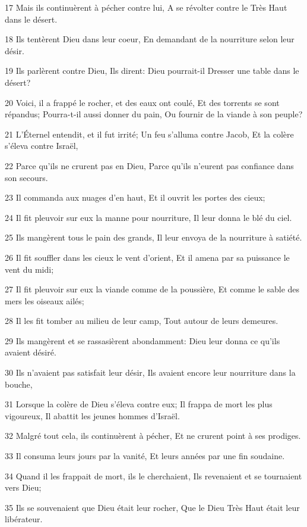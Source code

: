 \par 17 Mais ils continuèrent à pécher contre lui, A se révolter contre le Très Haut dans le désert.
\par 18 Ils tentèrent Dieu dans leur coeur, En demandant de la nourriture selon leur désir.
\par 19 Ils parlèrent contre Dieu, Ils dirent: Dieu pourrait-il Dresser une table dans le désert?
\par 20 Voici, il a frappé le rocher, et des eaux ont coulé, Et des torrents se sont répandus; Pourra-t-il aussi donner du pain, Ou fournir de la viande à son peuple?
\par 21 L'Éternel entendit, et il fut irrité; Un feu s'alluma contre Jacob, Et la colère s'éleva contre Israël,
\par 22 Parce qu'ils ne crurent pas en Dieu, Parce qu'ils n'eurent pas confiance dans son secours.
\par 23 Il commanda aux nuages d'en haut, Et il ouvrit les portes des cieux;
\par 24 Il fit pleuvoir sur eux la manne pour nourriture, Il leur donna le blé du ciel.
\par 25 Ils mangèrent tous le pain des grands, Il leur envoya de la nourriture à satiété.
\par 26 Il fit souffler dans les cieux le vent d'orient, Et il amena par sa puissance le vent du midi;
\par 27 Il fit pleuvoir sur eux la viande comme de la poussière, Et comme le sable des mers les oiseaux ailés;
\par 28 Il les fit tomber au milieu de leur camp, Tout autour de leurs demeures.
\par 29 Ils mangèrent et se rassasièrent abondamment: Dieu leur donna ce qu'ils avaient désiré.
\par 30 Ils n'avaient pas satisfait leur désir, Ils avaient encore leur nourriture dans la bouche,
\par 31 Lorsque la colère de Dieu s'éleva contre eux; Il frappa de mort les plus vigoureux, Il abattit les jeunes hommes d'Israël.
\par 32 Malgré tout cela, ils continuèrent à pécher, Et ne crurent point à ses prodiges.
\par 33 Il consuma leurs jours par la vanité, Et leurs années par une fin soudaine.
\par 34 Quand il les frappait de mort, ils le cherchaient, Ils revenaient et se tournaient vers Dieu;
\par 35 Ils se souvenaient que Dieu était leur rocher, Que le Dieu Très Haut était leur libérateur.
